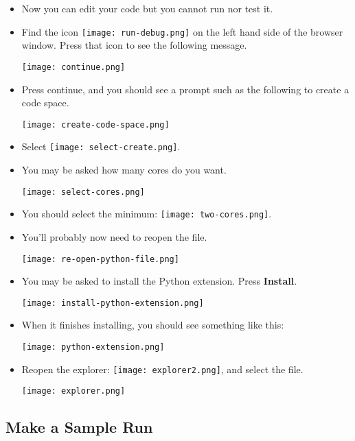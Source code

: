 \begin{itemize}

\item Now you can edit your code but you cannot run nor test it.

\item Find the icon \texttt{[image: run-debug.png]} on the left hand side of the browser window.   Press that icon to see the following message.

\noindent\texttt{[image: continue.png]}

\item Press continue, and you should see a prompt such as the following to create a code space.   

\noindent\texttt{[image: create-code-space.png]}

\item Select \texttt{[image: select-create.png]}.

\item You may be asked how many cores do you want.

\noindent\texttt{[image: select-cores.png]}

\item You should select the minimum: \texttt{[image: two-cores.png]}.

\item You'll probably now need to reopen the  file.

\noindent\texttt{[image: re-open-python-file.png]}

\item You may be asked to install the Python extension.  Press \textbf{Install}.

\noindent\texttt{[image: install-python-extension.png]}


\item When it finishes installing, you should see something like this:

\noindent\texttt{[image: python-extension.png]}

\item Reopen the explorer: \texttt{[image: explorer2.png]}, and select the  file.

\noindent\texttt{[image: explorer.png]}
\end{itemize}

\subsection{Make a Sample Run}

